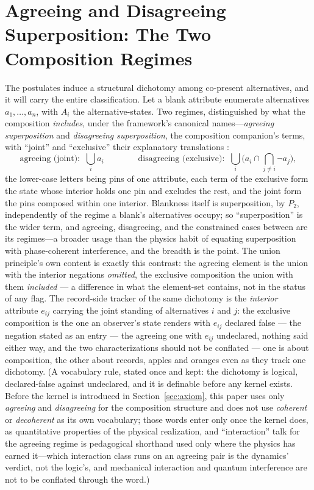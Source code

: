 \section{Agreeing and Disagreeing Superposition: The Two Composition Regimes}\label{sec:regimes}
The postulates induce a structural dichotomy among co-present alternatives, and it will carry the entire classification. Let a blank attribute enumerate alternatives $a_1, \dots, a_n$, with $A_i$ the alternative-states. Two regimes, distinguished by what the composition \emph{includes}, under the framework's canonical names---\emph{agreeing superposition} and \emph{disagreeing superposition}, the composition companion's terms, with ``joint'' and ``exclusive'' their explanatory translations \cite{AethusUnion}:
\begin{equation}\label{eq:regimes}
\text{agreeing (joint):}\;\; \bigcup_i a_i \qquad\qquad \text{disagreeing (exclusive):}\;\; \bigcup_i \Big( a_i \cap \bigcap_{j \neq i} \neg a_j \Big),
\end{equation}
the lower-case letters being pins of one attribute, each term of the exclusive form the state whose interior holds one pin and excludes the rest, and the joint form the pins composed within one interior. Blankness itself is superposition, by $P_2$, independently of the regime a blank's alternatives occupy; so ``superposition'' is the wider term, and agreeing, disagreeing, and the constrained cases between are its regimes---a broader usage than the physics habit of equating superposition with phase-coherent interference, and the breadth is the point.
The union principle's own content is exactly this contrast: the agreeing element is the union with the interior negations \emph{omitted}, the exclusive composition the union with them \emph{included} --- a difference in what the element-set contains, not in the status of any flag. The record-side tracker of the same dichotomy is the \emph{interior} attribute $e_{ij}$ carrying the joint standing of alternatives $i$ and $j$: the exclusive composition is the one an observer's state renders with $e_{ij}$ declared false --- the negation stated as an entry --- the agreeing one with $e_{ij}$ undeclared, nothing said either way, and the two characterizations should not be conflated --- one is about composition, the other about records, apples and oranges even as they track one dichotomy. (A vocabulary rule, stated once and kept: the dichotomy is logical, declared-false against undeclared, and it is definable before any kernel exists. Before the kernel is introduced in Section~\ref{sec:axiom}, this paper uses only \emph{agreeing} and \emph{disagreeing} for the composition structure and does not use \emph{coherent} or \emph{decoherent} as its own vocabulary; those words enter only once the kernel does, as quantitative properties of the physical realization, and ``interaction'' talk for the agreeing regime is pedagogical shorthand used only where the physics has earned it---which interaction class runs on an agreeing pair is the dynamics' verdict, not the logic's, and mechanical interaction and quantum interference are not to be conflated through the word.)
